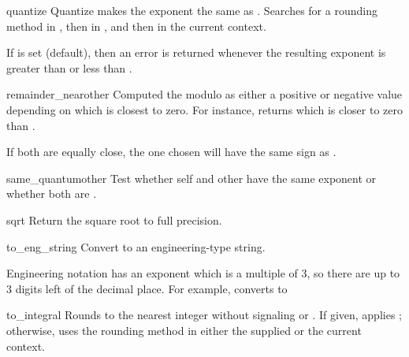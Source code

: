 \begin{methoddesc}{quantize}
  {}
  Quantize makes the exponent the same as .  Searches for a
  rounding method in , then in , and then
  in the current context.

  If  is set (default), then an error is returned whenever
  the resulting exponent is greater than  or less than
  .
\end{methoddesc} 

\begin{methoddesc}{remainder_near}{other}
  Computed the modulo as either a positive or negative value depending
  on which is closest to zero.  For instance,
   returns 
  which is closer to zero than .

  If both are equally close, the one chosen will have the same sign
  as .
\end{methoddesc}  

\begin{methoddesc}{same_quantum}{other}
  Test whether self and other have the same exponent or whether both
  are .
\end{methoddesc}

\begin{methoddesc}{sqrt}{}
  Return the square root to full precision.
\end{methoddesc}                    
 
\begin{methoddesc}{to_eng_string}{}
  Convert to an engineering-type string.

  Engineering notation has an exponent which is a multiple of 3, so there
  are up to 3 digits left of the decimal place.  For example, converts
   to 
\end{methoddesc}  

\begin{methoddesc}{to_integral}{}                   
  Rounds to the nearest integer without signaling 
  or .  If given, applies ; otherwise,
  uses the rounding method in either the supplied  or the
  current context.
\end{methoddesc} 

